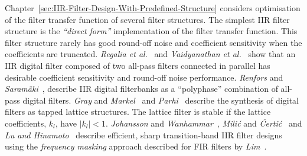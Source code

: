 \documentclass[a4paper,twoside,10pt,english]{report}
\begin{document}
Chapter~\ref{sec:IIR-Filter-Design-With-Predefined-Structure} considers 
optimisation of the filter transfer function of several filter structures.
The simplest IIR filter structure is the \emph{``direct form''} implementation
of the filter transfer function. This filter structure rarely has good
round-off noise and coefficient sensitivity when the coefficients are truncated.
\emph{Regalia et al.}~\cite{RegaliaMitraVaidyanathan_DigitalAllPassFilterVersatileSignalProcessing}
and 
\emph{Vaidyanathan et al.}~\cite{VaidyanathanMitraNuevo_LowSensitivityIIRDigitalFilters} 
show that an IIR digital filter composed of two all-pass filters connected in 
parallel has desirable coefficient sensitivity and round-off noise performance. 
\emph{Renfors} and 
\emph{Saram\"{a}ki}~\cite{RenforsSaramaki_RecursiveNthBandDigitalFiltersPart1,RenforsSaramaki_RecursiveNthBandDigitalFiltersPart2}, 
describe IIR digital filterbanks as a ``polyphase'' combination of all-pass
digital filters.
\emph{Gray} and
\emph{Markel}~\cite{GrayMarkel_DigitalLatticeAndLadderFilterSynthesis} and
\emph{Parhi}~\cite[Chapter 12]{Parhi_VLSIDigitalSignalProcessingSystems} describe
the synthesis of digital filters as tapped lattice structures. The lattice 
filter is stable if the lattice coefficients, $k_{l}$, have 
$\left|k_{l}\right|<1$. 
\emph{Johansson} and 
\emph{Wanhammar}~\cite{JohanssonWanhammar_RecursiveDigitalFiltersFrequencyMasking}, 
\emph{Mili\'{c}} and 
\emph{\'{C}erti\'{c}}~\cite{MilicCertic_IIRFilterBanksFrequencyResponseMasking} 
and 
\emph{Lu and Hinamoto}~\cite{LuHinamoto_IIRFrequencyMaskingFiltersConeProgramming} 
describe efficient, sharp transition-band IIR filter designs using the
\emph{frequency masking} approach described for FIR filters by 
\emph{Lim}~\cite{Lim_FrequencyResponseMaskingSharpDigitalFilters}.
\end{document}
